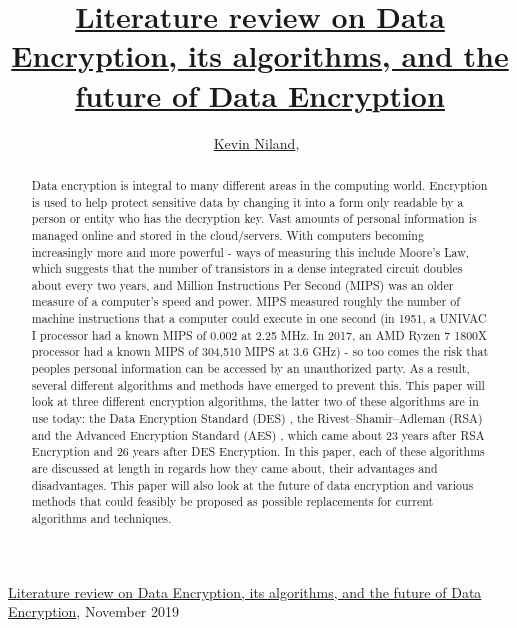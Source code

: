 \documentclass[journal]{IEEEtran}
\begin{document}
{\href{https://github.com/kevinniland97/Literature-review-on-Data-Encryption-algorithm}{Literature review on Data Encryption, its algorithms, and the future of Data Encryption}, November 2019}

\title{\href{https://github.com/kevinniland97/Literature-review-on-Data-Encryption-algorithms}{Literature review on Data Encryption, its algorithms, and the future of Data Encryption}}
\author{\href{https://github.com/kevinniland97}{Kevin Niland},~}
\maketitle

\begin{abstract}
Data encryption is integral to many different areas in the computing world. Encryption is used to help protect sensitive data by changing it into a form only readable by a person or entity who has the decryption key. Vast amounts of personal information is managed online and stored in the cloud/servers. With computers becoming increasingly more and more powerful - ways of measuring this include Moore's Law, which suggests that the number of transistors in a dense integrated circuit doubles about every two years, and Million Instructions Per Second (MIPS) was an older measure of a computer's speed and power. MIPS measured roughly the number of machine instructions that a computer could execute in one second (in 1951, a UNIVAC I processor had a known MIPS of 0.002 at 2.25 MHz. In 2017, an AMD Ryzen 7 1800X processor had a known MIPS of 304,510 MIPS at 3.6 GHz) - so too comes the risk that peoples personal information can be accessed by an unauthorized party. As a result, several different algorithms and methods have emerged to prevent this. This paper will look at three different encryption algorithms, the latter two of these algorithms are in use today: the Data Encryption Standard (DES) \cite{des}, the Rivest–Shamir–Adleman (RSA) \cite{rsa} and the Advanced Encryption Standard (AES) \cite{aes}, which came about 23 years after RSA Encryption and 26 years after DES Encryption. In this paper, each of these algorithms are discussed at length in regards how they came about, their advantages and disadvantages. This paper will also look at the future of data encryption and various methods that could feasibly be proposed as possible replacements for current algorithms and techniques. 
\end{abstract}
\end{document}
